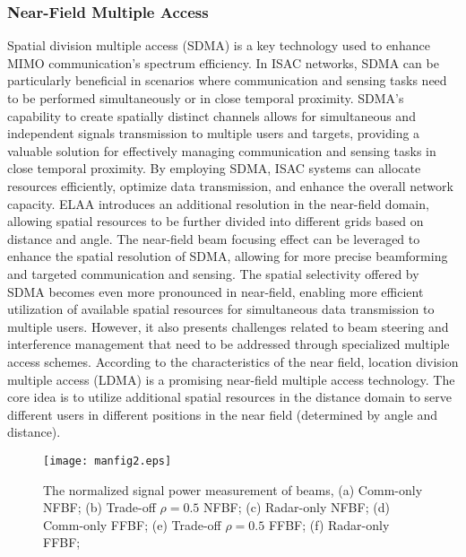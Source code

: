 \documentclass[10pt,journal,twocolumn,twoside]{IEEEtran} %
\begin{document}
\subsubsection{\textbf{Near-Field Multiple Access}}
Spatial division multiple access (SDMA) is a key technology used to enhance MIMO communication's spectrum efficiency. 
In ISAC networks, SDMA can be particularly beneficial in scenarios where communication and sensing tasks need to be performed simultaneously or in close temporal proximity. SDMA's capability to create spatially distinct channels allows for simultaneous and independent signals transmission to multiple users and targets, providing a valuable solution for effectively managing communication and sensing tasks in close temporal proximity. By employing SDMA, ISAC systems can allocate resources efficiently, optimize data transmission, and enhance the overall network capacity. 
 ELAA introduces an additional resolution in the near-field domain, allowing spatial resources to be further divided into different grids based on distance and angle. The near-field beam focusing effect can be leveraged to enhance the spatial resolution of SDMA, allowing for more precise beamforming and targeted communication and sensing. The spatial selectivity offered by SDMA becomes even more pronounced in near-field, enabling more efficient utilization of available spatial resources for simultaneous data transmission to multiple users. However, it also presents challenges related to beam steering and interference management that need to be addressed through specialized multiple access schemes.
According to the characteristics of the near field, location division multiple access (LDMA)  \cite{ldma} is a promising near-field multiple access technology. The core idea is to utilize additional spatial resources in the distance domain to serve different users in different positions in the near field (determined by angle and distance).
\begin{figure*}[t]
       \centering
       \texttt{[image: manfig2.eps]}
       \caption{The normalized signal power measurement of beams, (a) Comm-only NFBF; (b) Trade-off $\rho=0.5$ NFBF; (c) Radar-only NFBF; (d) Comm-only FFBF; (e) Trade-off $\rho=0.5$ FFBF; (f) Radar-only FFBF; }
       \label{fig5}
\end{figure*}
\end{document}
